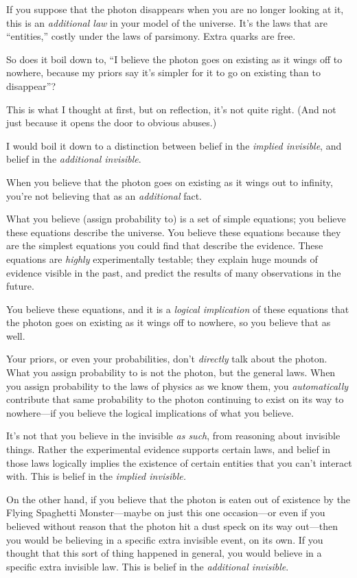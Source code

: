 {
 If you suppose that the photon disappears when you are no longer
looking at it, this is an \textit{additional law} in your model of the
universe. It's the laws that are
``entities,'' costly under the laws
of parsimony. Extra quarks are free.}

{
 So does it boil down to, ``I believe the photon
goes on existing as it wings off to nowhere, because my priors say
it's simpler for it to go on existing than to
disappear''?}

{
 This is what I thought at first, but on reflection,
it's not quite right. (And not just because it opens
the door to obvious abuses.)}

{
 I would boil it down to a distinction between belief in the
\textit{implied invisible}, and belief in the \textit{additional
invisible}.}

{
 When you believe that the photon goes on existing as it wings out
to infinity, you're not believing that as an
\textit{additional} fact.}

{
 What you believe (assign probability to) is a set of simple
equations; you believe these equations describe the universe. You
believe these equations because they are the simplest equations you
could find that describe the evidence. These equations are
\textit{highly} experimentally testable; they explain huge mounds of
evidence visible in the past, and predict the results of many
observations in the future.}

{
 You believe these equations, and it is a \textit{logical
implication} of these equations that the photon goes on existing as it
wings off to nowhere, so you believe that as well.}

{
 Your priors, or even your probabilities, don't
\textit{directly} talk about the photon. What you assign probability to
is not the photon, but the general laws. When you assign probability to
the laws of physics as we know them, you \textit{automatically}
contribute that same probability to the photon continuing to exist on
its way to nowhere---if you believe the logical implications of what
you believe.}

{
 It's not that you believe in the invisible
\textit{as such}, from reasoning about invisible things. Rather the
experimental evidence supports certain laws, and belief in those laws
logically implies the existence of certain entities that you
can't interact with. This is belief in the
\textit{implied invisible.}}

{
 On the other hand, if you believe that the photon is eaten out of
existence by the Flying Spaghetti Monster---maybe on just this one
occasion---or even if you believed without reason that the photon hit a
dust speck on its way out---then you would be believing in a specific
extra invisible event, on its own. If you thought that this sort of
thing happened in general, you would believe in a specific extra
invisible law. This is belief in the \textit{additional invisible}.}

